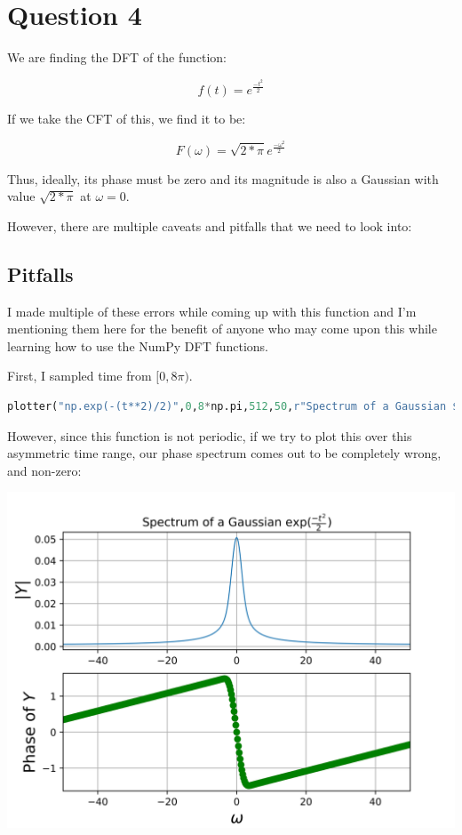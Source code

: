 \documentclass[12pt]{article}
\begin{document}
\section{Question 4}

We are finding the DFT of the function:

$$f(t) = e^{\frac{-t^2}{2}}$$

If we take the CFT of this, we find it to be:

$$F(\omega) = \sqrt{2*\pi}e^{\frac{-\omega^2}{2}}$$

Thus, ideally, its phase must be zero and its magnitude is also a Gaussian with value $\sqrt{2*\pi}$ at $\omega=0$.

However, there are multiple caveats and pitfalls that we need to look into:

\subsection{Pitfalls}

I made multiple of these errors while coming up with this function and I'm mentioning them here for the benefit of anyone who may come upon this while learning how to use the NumPy DFT functions.

First, I sampled time from $[0,8\pi)$.

\begin{lstlisting}[language=Python]
plotter("np.exp(-(t**2)/2)",0,8*np.pi,512,50,r"Spectrum of a Gaussian $\exp(\frac{-t^2}{2})$",sig=False,save=True,fignum=8)
\end{lstlisting}

However, since this function is not periodic, if we try to plot this over this asymmetric time range, our phase spectrum comes out to be completely wrong, and non-zero:

\begin{center}
    \includegraphics[scale=1]{images/fig8.png}
\end{center}
\end{document}
